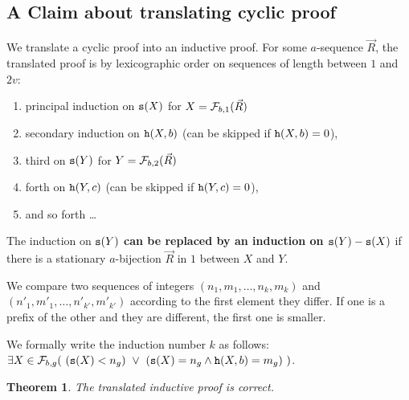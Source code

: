 \documentclass{lmcs}
\newtheorem{theorem}{Theorem}[section]
\begin{document}
\subsection{A Claim about translating cyclic proof}
We translate a cyclic proof into an inductive proof. For some $a$-sequence
$\vec{R}$, the translated proof is by lexicographic order on sequences 
of length between $1$ and $2v$:

\begin{enumerate}
\item
principal induction on ${\tt s}( X )$ for $X = {\mathcal F}_{b,1}(\vec{R})$ 
\item
secondary induction on ${\tt h}(X,b)$ (can be skipped if ${\tt h}(X,b)=0$),
\item
third on ${\tt s}(Y)$ for $Y = {\mathcal F}_{b,2}(\vec{R})$
\item
forth on ${\tt h}(Y,c)$  (can be skipped if ${\tt h}(Y,c)=0$), 
\item
and so forth \ldots
\end{enumerate}

The induction on ${\tt s}(Y)$ {\bf can be replaced by an induction on ${\tt s}(Y) - {\tt s}(X)$}
if there is a stationary $a$-bijection $\vec{R}$ in $1$ between $X$ and $Y$.

We compare two sequences of integers $(n_1,m_1, \ldots, n_k, m_k)$
and  $(n'_1,m'_1, \ldots, n'_{k'}, m'_{k'})$ according to the first element they differ.
If one is a prefix of the other and they are different, the first one is smaller.

We formally write the induction number $k$ as follows: 
$\exists X \in {\mathcal F}_{b,g}
( \ ({\tt s}(X) < n_g) \ \vee \ ({\tt s}(X) = n_g \wedge {\tt h}(X,b) = m_g) \ )$.
\\


\begin{theorem}
The translated inductive proof is correct. 
\end{theorem}
\end{document}

